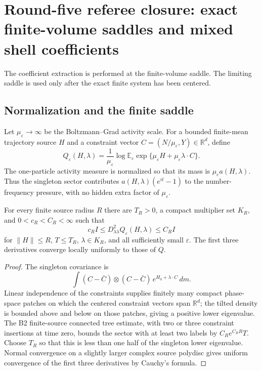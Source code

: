 \section{Round-five referee closure: exact finite-volume saddles and mixed shell coefficients}
\label{sec:r5-b1}

The coefficient extraction is performed at the finite-volume saddle.  The
limiting saddle is used only after the exact finite system has been centered.

\subsection{Normalization and the finite saddle}

Let \(\mu_\varepsilon\to\infty\) be the Boltzmann--Grad activity scale.  For a
bounded finite-mean trajectory source \(H\) and a constraint vector
\(C=(N/\mu_\varepsilon,Y)\in\mathbb R^d\), define
\[
 Q_\varepsilon(H,\lambda)
 =\frac1{\mu_\varepsilon}
  \log\mathbb E_\varepsilon
  \exp\{\mu_\varepsilon H+\mu_\varepsilon\lambda\cdot C\}.
\]
The one-particle activity measure is normalized so that its mass is
\(\mu_\varepsilon a(H,\lambda)\).  Thus the singleton sector contributes
\(a(H,\lambda)(e^{it}-1)\) to the number-frequency pressure, with no hidden
extra factor of \(\mu_\varepsilon\).

\begin{lemma}
\label{lem:r5-b1-convex}
For every finite source radius \(R\) there are \(T_R>0\), a compact
multiplier set \(K_R\), and \(0<c_R<C_R<\infty\) such that
\[
 c_RI\le D_{\lambda\lambda}^2Q_\varepsilon(H,\lambda)
       \le C_RI
\]
for \(\|H\|\le R\), \(T\le T_R\), \(\lambda\in K_R\), and all sufficiently
small \(\varepsilon\).  The first three derivatives converge locally
uniformly to those of \(Q\).
\end{lemma}

\begin{proof}
The singleton covariance is
\[
 \int(C-\bar C)\otimes(C-\bar C)\,
       e^{H_0+\lambda\cdot C}\,dm.
\]
Linear independence of the constraints supplies finitely many compact
phase-space patches on which the centered constraint vectors span
\(\mathbb R^d\); the tilted density is bounded above and below on those
patches, giving a positive lower eigenvalue.  The B2 finite-source connected
tree estimate, with two or three constraint insertions at time zero, bounds
the sector with at least two labels by \(C_Re^{C_RR}T\).  Choose \(T_R\) so
that this is less than one half of the singleton lower eigenvalue.  Normal
convergence on a slightly larger complex source polydisc gives uniform
convergence of the first three derivatives by Cauchy's formula.
\end{proof}

